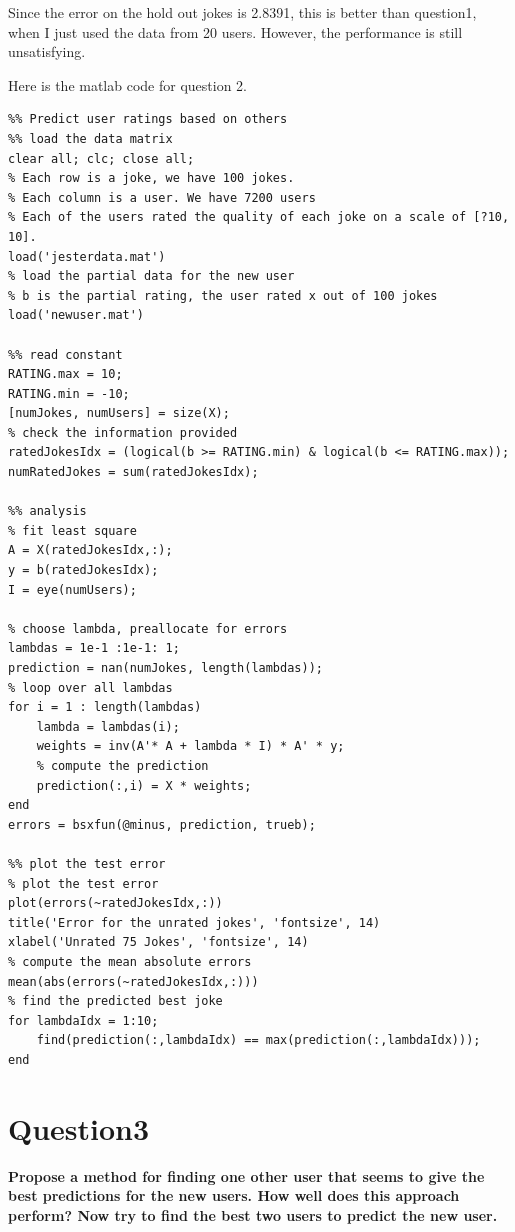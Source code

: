 \documentclass[paper=a4, fontsize=11pt]{scrartcl} %
\numberwithin{equation}{section} %
\numberwithin{figure}{section} %
\numberwithin{table}{section} %
\begin{document}
Since the error on the hold out jokes is 2.8391, this is better than question1, when I just used the data from 20 users. However, the performance is still unsatisfying. 

\newpage
Here is the matlab code for question 2. 
\begin{lstlisting}
%% Predict user ratings based on others
%% load the data matrix
clear all; clc; close all; 
% Each row is a joke, we have 100 jokes.  
% Each column is a user. We have 7200 users 
% Each of the users rated the quality of each joke on a scale of [?10, 10].
load('jesterdata.mat')
% load the partial data for the new user 
% b is the partial rating, the user rated x out of 100 jokes
load('newuser.mat')

%% read constant 
RATING.max = 10;
RATING.min = -10;
[numJokes, numUsers] = size(X);
% check the information provided 
ratedJokesIdx = (logical(b >= RATING.min) & logical(b <= RATING.max)); 
numRatedJokes = sum(ratedJokesIdx);

%% analysis 
% fit least square 
A = X(ratedJokesIdx,:);
y = b(ratedJokesIdx);
I = eye(numUsers);

% choose lambda, preallocate for errors
lambdas = 1e-1 :1e-1: 1;
prediction = nan(numJokes, length(lambdas));
% loop over all lambdas
for i = 1 : length(lambdas)
    lambda = lambdas(i);
    weights = inv(A'* A + lambda * I) * A' * y;
    % compute the prediction 
    prediction(:,i) = X * weights;
end
errors = bsxfun(@minus, prediction, trueb);

%% plot the test error 
% plot the test error 
plot(errors(~ratedJokesIdx,:))
title('Error for the unrated jokes', 'fontsize', 14)
xlabel('Unrated 75 Jokes', 'fontsize', 14)
% compute the mean absolute errors
mean(abs(errors(~ratedJokesIdx,:)))
% find the predicted best joke
for lambdaIdx = 1:10; 
    find(prediction(:,lambdaIdx) == max(prediction(:,lambdaIdx)));
end
\end{lstlisting}
\newpage
\section*{Question3}
\textbf{Propose a method for finding one other user that seems to give the best predictions for the new users. How well does this approach perform? Now try to find the best two users to predict the new user.} \\ 
\end{document}
